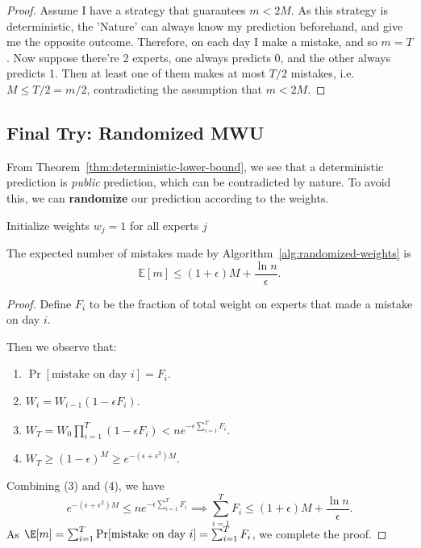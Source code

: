 \begin{proof}
  Assume I have a strategy that guarantees $m < 2M$. As this strategy is deterministic, the 'Nature' can always know my prediction beforehand, and give me the opposite outcome. Therefore, on each day I make a mistake, and so $m = T$.
  Now suppose there're 2 experts, one always predicts 0, and the other always predicts 1. Then at least one of them makes at most $T/2$ mistakes, i.e. $M \leq T/2 = m/2$, contradicting the assumption that $m < 2M$.
\end{proof}

\subsection{Final Try: Randomized MWU}

From Theorem~\ref{thm:deterministic-lower-bound}, we see that a deterministic prediction is \textit{public} prediction, which can be contradicted by nature. To avoid this, we can \textbf{randomize} our prediction according to the weights.

\begin{algorithm}[H]
    \caption{Randomized MWU Algorithm}
    \label{alg:randomized-weights}
    Initialize weights $w_j = 1$ for all experts $j$\;
\end{algorithm}

\begin{theorem}
  The expected number of mistakes made by Algorithm~\ref{alg:randomized-weights} is
  \[ \mathbb{E}[m] \leq (1+\epsilon) M + \frac{\ln n}{\epsilon}. \]
\end{theorem}

\begin{proof}
  Define $F_i$ to be the fraction of total weight on experts that made a mistake on day $i$.

  Then we observe that:
  \begin{enumerate}
    \item $\Pr[\text{mistake on day } i] = F_i$.
    \item $W_i = W_{i-1} (1 - \epsilon F_i)$.
    \item $W_T = W_0 \prod_{i=1}^T (1 - \epsilon F_i) < n e^{-\epsilon \sum_{i=1}^T F_i}$.
    \item $W_T \geq (1 - \epsilon)^M \geq e^{-(\epsilon + \epsilon^2) M}$.
  \end{enumerate}
  Combining (3) and (4), we have
  \[ e^{-(\epsilon + \epsilon^2) M} \leq n e^{-\epsilon \sum_{i=1}^T F_i} \implies \sum_{i=1}^T F_i \leq (1+\epsilon) M + \frac{\ln n}{\epsilon}. \]
  As $\E[m] = \sum_{i=1}^T \Pr[\text{mistake on day } i] = \sum_{i=1}^T F_i$, we complete the proof.
\end{proof}
